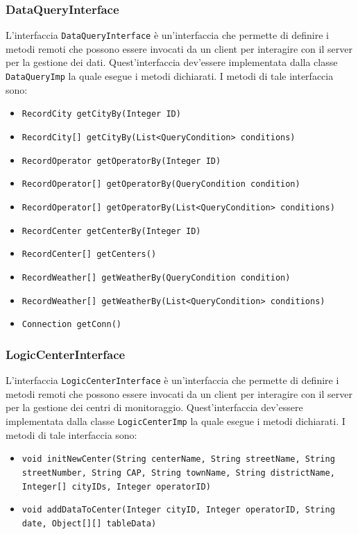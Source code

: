 \subsubsection{DataQueryInterface}
L'interfaccia \texttt{DataQueryInterface} è un'interfaccia che permette di definire i metodi remoti che possono
essere invocati da un client per interagire con il server per la gestione dei dati.
Quest'interfaccia dev'essere implementata dalla classe \texttt{DataQueryImp} la quale esegue i metodi dichiarati.
I metodi di tale interfaccia sono:
\begin{itemize}
    \item \texttt{RecordCity getCityBy(Integer ID)}
    \item \texttt{RecordCity[] getCityBy(List<QueryCondition> conditions)}
    \item \texttt{RecordOperator getOperatorBy(Integer ID)}
    \item \texttt{RecordOperator[] getOperatorBy(QueryCondition condition)}
    \item \texttt{RecordOperator[] getOperatorBy(List<QueryCondition> conditions)}
    \item \texttt{RecordCenter getCenterBy(Integer ID)}
    \item \texttt{RecordCenter[] getCenters()}
    \item \texttt{RecordWeather[] getWeatherBy(QueryCondition condition)}
    \item \texttt{RecordWeather[] getWeatherBy(List<QueryCondition> conditions)}
    \item \texttt{Connection getConn()}
\end{itemize}

\subsubsection{LogicCenterInterface}
L'interfaccia \texttt{LogicCenterInterface} è un'interfaccia che permette di definire i metodi remoti che possono
essere invocati da un client per interagire con il server per la gestione dei centri di monitoraggio.
Quest'interfaccia dev'essere implementata dalla classe \texttt{LogicCenterImp} la quale esegue i metodi dichiarati.
I metodi di tale interfaccia sono:
\begin{itemize}
    \item \texttt{void initNewCenter(String centerName, String streetName, String streetNumber, String CAP, String townName, String districtName, Integer[] cityIDs, Integer operatorID)}
    \item \texttt{void addDataToCenter(Integer cityID, Integer operatorID, String date, Object[][] tableData)}
\end{itemize}

